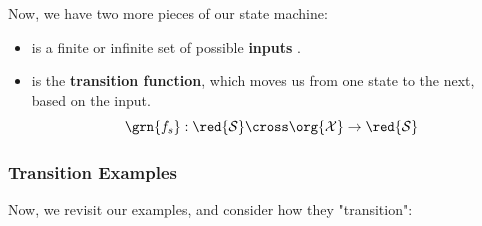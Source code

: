             Now, we have two more pieces of our state machine:
            
            \begin{itemize}
                \item {} is a finite or infinite set of possible \textbf{inputs} .
                \item {} is the \textbf{transition function}, which moves us from one state to the next, based on the input.
                    \begin{equation}
                        \grn{f_s}: \red{\mathcal{S}} \cross \org{\mathcal{X}} 
                        \rightarrow \red{\mathcal{S}}
                    \end{equation}
            \end{itemize}
        
        \subsubsection{Transition Examples}
        
            Now, we revisit our examples, and consider how they "transition":
            
